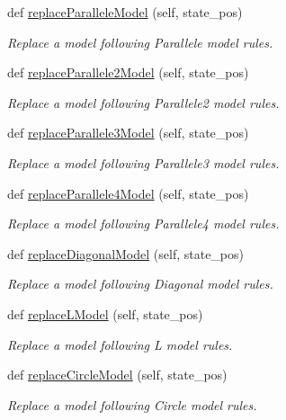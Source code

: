 \begin{DoxyCompactItemize}
def \mbox{\hyperlink{classmozia_1_1MOZIA_a026b1dfe6089b9c23c619495a7a47c07}{replace\+Parallele\+Model}} (self, state\+\_\+pos)
\begin{DoxyCompactList}\small\item\em Replace a model following Parallele model rules. \end{DoxyCompactList}\item 
def \mbox{\hyperlink{classmozia_1_1MOZIA_a8a6a9699370fc7a98c5558531f9d64fa}{replace\+Parallele2\+Model}} (self, state\+\_\+pos)
\begin{DoxyCompactList}\small\item\em Replace a model following Parallele2 model rules. \end{DoxyCompactList}\item 
def \mbox{\hyperlink{classmozia_1_1MOZIA_a58e24c0db293f7bea6200ed8fb0b3bc2}{replace\+Parallele3\+Model}} (self, state\+\_\+pos)
\begin{DoxyCompactList}\small\item\em Replace a model following Parallele3 model rules. \end{DoxyCompactList}\item 
def \mbox{\hyperlink{classmozia_1_1MOZIA_a29aafaac93b9d4886b6d3a2ac8381e95}{replace\+Parallele4\+Model}} (self, state\+\_\+pos)
\begin{DoxyCompactList}\small\item\em Replace a model following Parallele4 model rules. \end{DoxyCompactList}\item 
def \mbox{\hyperlink{classmozia_1_1MOZIA_af995224d265feaf5ed9d92b1dd21a435}{replace\+Diagonal\+Model}} (self, state\+\_\+pos)
\begin{DoxyCompactList}\small\item\em Replace a model following Diagonal model rules. \end{DoxyCompactList}\item 
def \mbox{\hyperlink{classmozia_1_1MOZIA_af2e034d0499d8776027e14208463ae02}{replace\+L\+Model}} (self, state\+\_\+pos)
\begin{DoxyCompactList}\small\item\em Replace a model following L model rules. \end{DoxyCompactList}\item 
def \mbox{\hyperlink{classmozia_1_1MOZIA_ada3027d13bfaab95de212b41c9c74c35}{replace\+Circle\+Model}} (self, state\+\_\+pos)
\begin{DoxyCompactList}\small\item\em Replace a model following Circle model rules. \end{DoxyCompactList}\end{DoxyCompactItemize}

